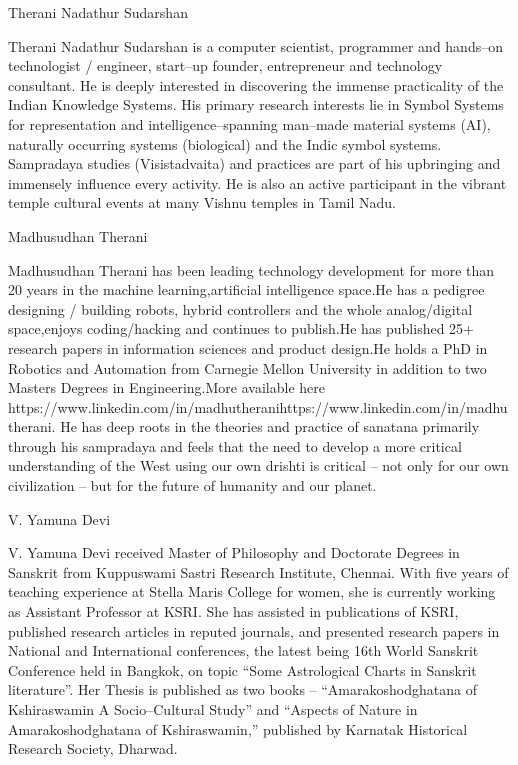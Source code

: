 Therani Nadathur Sudarshan

Therani Nadathur Sudarshan is a computer scientist, programmer and hands–on technologist / engineer, start–up founder, entrepreneur and technology consultant. He is deeply interested in discovering the immense practicality of the Indian Knowledge Systems. His primary research interests lie in Symbol Systems for representation and intelligence–spanning man–made material systems (AI), naturally occurring systems (biological) and the Indic symbol systems. Sampradaya studies (Visistadvaita) and practices are part of his upbringing and immensely influence every activity. He is also an active participant in the vibrant temple cultural events at many Vishnu temples in Tamil Nadu.

Madhusudhan Therani

Madhusudhan Therani has been leading technology development for more than 20 years in the machine learning,artificial intelligence space.He has a pedigree designing / building robots, hybrid controllers and the whole analog/digital space,enjoys coding/hacking and continues to publish.He has published 25+ research papers in information sciences and product design.He holds a PhD in Robotics and Automation from Carnegie Mellon University in addition to two Masters Degrees in Engineering.More available here https://www.linkedin.com/in/madhutheranihttps://www.linkedin.com/in/madhutherani. He has deep roots in the theories and practice of sanatana primarily through his sampradaya and feels that the need to develop a more critical understanding of the West using our own drishti is critical – not only for our own civilization – but for the future of humanity and our planet.

V. Yamuna Devi

V. Yamuna Devi received Master of Philosophy and Doctorate Degrees in Sanskrit from Kuppuswami Sastri Research Institute, Chennai. With five years of teaching experience at Stella Maris College for women, she is currently working as Assistant Professor at KSRI. She has assisted in publications of KSRI, published research articles in reputed journals, and presented research papers in National and International conferences, the latest being 16th World Sanskrit Conference held in Bangkok, on topic “Some Astrological Charts in Sanskrit literature”. Her Thesis is published as two books – “Amarakoshodghatana of Kshiraswamin A Socio–Cultural Study” and “Aspects of Nature in Amarakoshodghatana of Kshiraswamin,” published by Karnatak Historical Research Society, Dharwad.

